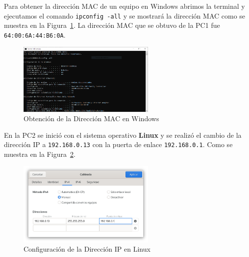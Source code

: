         Para obtener la dirección MAC de un equipo en Windows abrimos la terminal y ejecutamos el comando \texttt{ipconfig -all} y se mostrará la dirección MAC como se muestra en la Figura~\ref{fig:mac_windows}. La dirección MAC que se obtuvo de la PC1 fue \texttt{64:00:6A:44:B6:0A}.

        \begin{figure}[H]
            \centering
            \includegraphics[width=0.6\textwidth]{img/direccion_MAC_windows.PNG}
            \caption{Obtención de la Dirección MAC en Windows}
            \label{fig:mac_windows}
        \end{figure}

        En la PC2 se inició con el sistema operativo \textbf{Linux} y se realizó el cambio de la dirección IP a \texttt{192.168.0.13} con la puerta de enlace \texttt{192.168.0.1}. Como se muestra en la Figura~\ref{fig:ip_linux}.

        \begin{figure}[H]
            \centering
            \includegraphics[width=0.6\textwidth]{img/cambiar_IP_Linux.png}
            \caption{Configuración de la Dirección IP en Linux}
            \label{fig:ip_linux}
        \end{figure}
        
